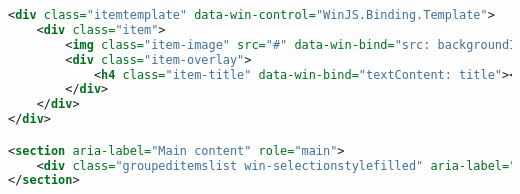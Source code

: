 \begin{lstlisting}[language= XML,caption=Die wichtigsten Markupelemente der Hubansicht., label={lst:hubmarkup}]
<div class="itemtemplate" data-win-control="WinJS.Binding.Template">
    <div class="item">
        <img class="item-image" src="#" data-win-bind="src: backgroundImage; alt: title" />
        <div class="item-overlay">
            <h4 class="item-title" data-win-bind="textContent: title"></h4>
        </div>
    </div>
</div>

<section aria-label="Main content" role="main">
    <div class="groupeditemslist win-selectionstylefilled" aria-label="List of groups" data-win-control="WinJS.UI.ListView" data-win-options="{selectionMode: 'none'}"></div>
</section>
\end{lstlisting} 